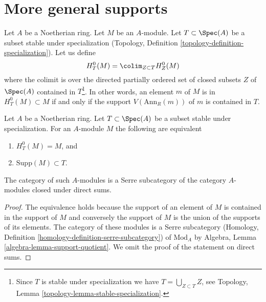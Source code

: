 






\section{More general supports}
\label{section-supports}

\noindent
Let $A$ be a Noetherian ring. Let $M$ be an $A$-module.
Let $T \subset \Spec(A)$ be a subset stable under specialization
(Topology, Definition \ref{topology-definition-specialization}).
Let us define
$$
H^0_T(M) = \colim_{Z \subset T} H^0_Z(M)
$$
where the colimit is over the directed partially ordered set of
closed subsets $Z$ of $\Spec(A)$ contained in
$T$\footnote{Since $T$ is stable under specialization
we have $T = \bigcup_{Z \subset T} Z$, see
Topology, Lemma \ref{topology-lemma-stable-specialization}.}.
In other words, an element $m$ of $M$ is in $H^0_T(M) \subset M$
if and only if the support $V(\text{Ann}_R(m))$ of $m$
is contained in $T$.

\begin{lemma}
\label{lemma-support}
Let $A$ be a Noetherian ring. Let $T \subset \Spec(A)$ be a subset stable
under specialization. For an $A$-module $M$ the following are equivalent
\begin{enumerate}
\item $H^0_T(M) = M$, and
\item $\text{Supp}(M) \subset T$.
\end{enumerate}
The category of such $A$-modules is a Serre subcategory
of the category $A$-modules closed under direct sums.
\end{lemma}

\begin{proof}
The equivalence holds because the support of an element of $M$
is contained in the support of $M$ and conversely the support of
$M$ is the union of the supports of its elements.
The category of these modules is a Serre subcategory
(Homology, Definition \ref{homology-definition-serre-subcategory})
of $\text{Mod}_A$ by
Algebra, Lemma \ref{algebra-lemma-support-quotient}.
We omit the proof of the statement on direct sums.
\end{proof}

